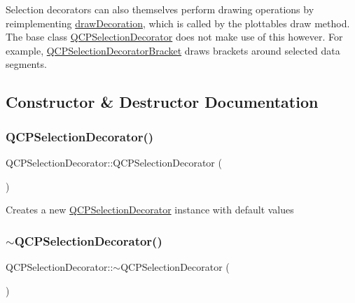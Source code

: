 Selection decorators can also themselves perform drawing operations by reimplementing \hyperlink{class_q_c_p_selection_decorator_a4f8eb49e277063845391e803ae23054a}{draw\+Decoration}, which is called by the plottable\textquotesingle{}s draw method. The base class \hyperlink{class_q_c_p_selection_decorator}{Q\+C\+P\+Selection\+Decorator} does not make use of this however. For example, \hyperlink{class_q_c_p_selection_decorator_bracket}{Q\+C\+P\+Selection\+Decorator\+Bracket} draws brackets around selected data segments. 

\subsection{Constructor \& Destructor Documentation}
\mbox{\label{class_q_c_p_selection_decorator_aa145480d9a062cd176fe30900bb7bca8}} 
\subsubsection{\texorpdfstring{Q\+C\+P\+Selection\+Decorator()}{QCPSelectionDecorator()}}
{\footnotesize\ttfamily Q\+C\+P\+Selection\+Decorator\+::\+Q\+C\+P\+Selection\+Decorator (\begin{DoxyParamCaption}{ }\end{DoxyParamCaption})}

Creates a new \hyperlink{class_q_c_p_selection_decorator}{Q\+C\+P\+Selection\+Decorator} instance with default values \mbox{\label{class_q_c_p_selection_decorator_ab211eb11379854dcbe23b1642be0d19e}} 
\subsubsection{\texorpdfstring{$\sim$\+Q\+C\+P\+Selection\+Decorator()}{~QCPSelectionDecorator()}}
{\footnotesize\ttfamily Q\+C\+P\+Selection\+Decorator\+::$\sim$\+Q\+C\+P\+Selection\+Decorator (\begin{DoxyParamCaption}{ }\end{DoxyParamCaption})\hspace{0.3cm}{\ttfamily [virtual]}}



